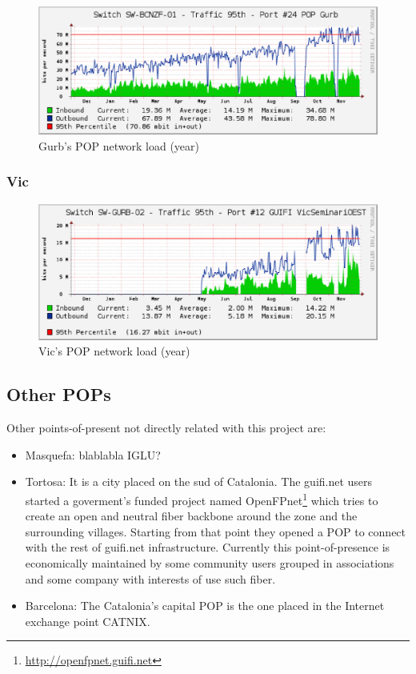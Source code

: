 \begin{figure}[htbp]
  \centering
  \includegraphics[scale=.65]{sect3/figures/gurb_network_load_year.eps} 
  \caption{Gurb's POP network load (year)}
  \label{fig:gurb_net_load}
\end{figure}


\subsubsection{Vic}



\begin{figure}[htbp]
  \centering
  \includegraphics[scale=.65]{sect3/figures/vic_network_load_year.eps} 
  \caption{Vic's POP network load (year)}
  \label{fig:vic_net_load}
\end{figure}



\subsection{Other POPs}

Other points-of-present not directly related with this project are:

\begin{itemize}
	\item Masquefa: blablabla IGLU?

	\item Tortosa: It is a city placed on the sud of Catalonia. The guifi.net users started a goverment's funded project named 
		OpenFPnet\footnote{\url{http://openfpnet.guifi.net}} which tries to create an open and neutral fiber backbone 
		around the zone and the surrounding villages. Starting from that point they opened a POP to connect with the 
		rest of guifi.net infrastructure. Currently this point-of-presence is economically maintained by some community 
		users grouped in associations and some company with interests of use such fiber.

	\item Barcelona: The Catalonia's capital POP is the one placed in the Internet exchange point CATNIX.
\end{itemize}

